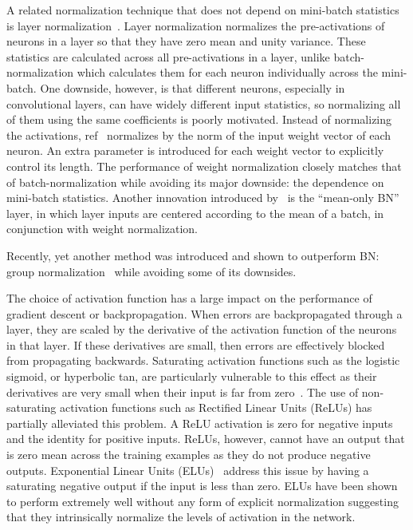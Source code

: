 \documentclass[conference]{IEEEtran}
\begin{document}
A related normalization technique that does not depend on mini-batch statistics is layer normalization~\cite{Ba_etal16}. Layer normalization normalizes the pre-activations of neurons in a layer so that they have zero mean and unity variance. These statistics are calculated across all pre-activations in a layer, unlike batch-normalization which calculates them for each neuron individually across the mini-batch. One downside, however, is that different neurons, especially in convolutional layers, can have widely different input statistics, so normalizing all of them using the same coefficients is poorly motivated. Instead of normalizing the activations, ref~\cite{Salimans_etal16a} normalizes by the norm of the input weight vector of each neuron. An extra parameter is introduced for each weight vector to explicitly control its length. The performance of weight normalization closely matches that of batch-normalization while avoiding its major downside: the dependence on mini-batch statistics. Another innovation introduced by~\cite{Salimans_etal16a} is the ``mean-only BN'' layer, in which layer inputs are centered according to the mean of a batch, in conjunction with weight normalization.

Recently, yet another method was introduced and shown to outperform BN: group normalization~\cite{Wu.18} while avoiding some of its downsides.

The choice of activation function has a large impact on the performance of gradient descent or backpropagation. When errors are backpropagated through a layer, they are scaled by the derivative of the activation function of the neurons in that layer.  If these derivatives are small, then errors are effectively blocked from propagating backwards. Saturating activation functions such as the logistic sigmoid, or hyperbolic tan, are particularly vulnerable to this effect as their derivatives are very small when their input is far from zero~\cite{Lecun_etal98}. The use of non-saturating activation functions such as Rectified Linear Units (ReLUs) has partially alleviated this problem. A ReLU activation is zero for negative inputs and the identity for positive inputs. ReLUs, however, cannot have an output that is zero mean across the training examples as they do not produce negative outputs. Exponential Linear Units (ELUs)~\cite{Clevert.15} address this issue by having a saturating negative output if the input is less than zero. ELUs have been shown to perform extremely well without any form of explicit normalization suggesting that they intrinsically normalize the levels of activation in the network.    
\end{document}
